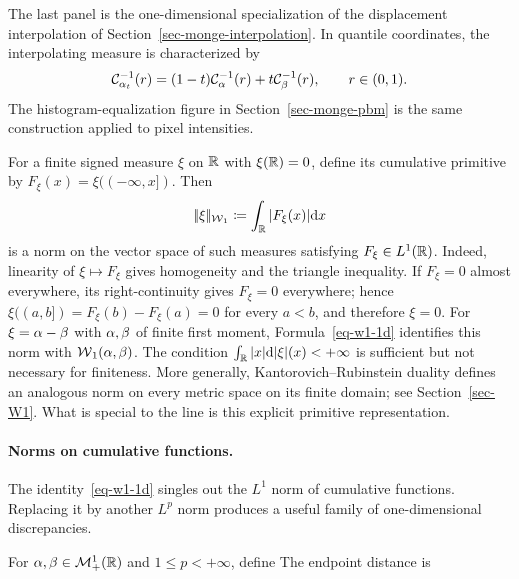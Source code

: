 The last panel is the one-dimensional specialization of the displacement interpolation of Section~\ref{sec-monge-interpolation}. In quantile coordinates, the interpolating measure is characterized by
\[
	\mathcal{C}_{\alpha_t}^{-1}(r)
	=
	(1-t)\mathcal{C}_{\alpha}^{-1}(r)+t\mathcal{C}_{\beta}^{-1}(r),
	\qquad r\in(0,1).
\]
The histogram-equalization figure in Section~\ref{sec-monge-pbm} is the same construction applied to pixel intensities.

\begin{rem}\label{rem-w1-norm-1d}
	For a finite signed measure $\xi$ on $\mathbb{R}$ with $\xi(\mathbb{R})=0$, define its cumulative primitive by $F_\xi(x)=\xi((-\infty,x])$. Then
	\[
		|\!| \xi |\!|_{\operatorname{\mathcal{W}}_1}\coloneqq\int_{\mathbb{R}}|F_\xi(x)|\mathrm{d} x
	\]
	is a norm on the vector space of such measures satisfying $F_\xi\in L^1(\mathbb{R})$. Indeed, linearity of $\xi\mapsto F_\xi$ gives homogeneity and the triangle inequality. If $F_\xi=0$ almost everywhere, its right-continuity gives $F_\xi=0$ everywhere; hence $\xi((a,b])=F_\xi(b)-F_\xi(a)=0$ for every $a<b$, and therefore $\xi=0$. For $\xi=\alpha-\beta$ with $\alpha,\beta$ of finite first moment, Formula~\eqref{eq-w1-1d} identifies this norm with $\operatorname{\mathcal{W}}_1(\alpha,\beta)$. The condition $\int_{\mathbb{R}} |x|\mathrm{d}|\xi|(x)<+\infty$ is sufficient but not necessary for finiteness. More generally, Kantorovich--Rubinstein duality defines an analogous norm on every metric space on its finite domain; see Section~\ref{sec-W1}. What is special to the line is this explicit primitive representation.
\end{rem}

\paragraph{Norms on cumulative functions.}
The identity~\eqref{eq-w1-1d} singles out the $L^1$ norm of cumulative functions. Replacing it by another $L^p$ norm produces a useful family of one-dimensional discrepancies.

\begin{defn}\label{def-cumulative-function-distance}
	For $\alpha,\beta\in\mathcal{M}_+^1(\mathbb{R})$ and $1\leq p<+\infty$, define
	The endpoint distance is
\end{defn}


